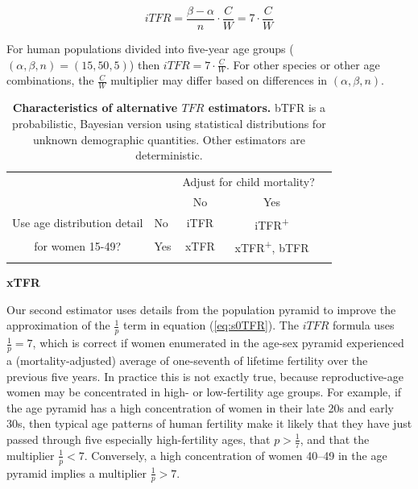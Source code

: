\documentclass[12pt]{article}
\begin{document}
\begin{equation}
\label{eq:iTFR}
iTFR  =  \frac{\beta - \alpha}{n}\cdot \frac{C}{W}  
      =  7\cdot\frac{C}{W}\nonumber 
\end{equation}

\noindent For human populations divided into five-year age groups
(\((\alpha,\beta,n)=(15,50,5)\)) then \(iTFR=7\cdot\tfrac{C}{W}\). For
other species or other age combinations, the \(\tfrac{C}{W}\) multiplier
may differ based on differences in \((\alpha,\beta,n)\).

\begin{table}[]
\centering
\caption{\textbf{Characteristics of alternative $TFR$ estimators.} bTFR is a probabilistic, Bayesian version using statistical distributions for unknown demographic quantities. Other estimators are deterministic.}
\label{methoddeployment}
\begin{tabular}{llccl}
                                                &                          & \multicolumn{2}{c}{Adjust for child mortality?}                                                                                        &  \\
                                                &                          & No                                                         & Yes                                                                       &  \\ \cline{3-4}
\multicolumn{1}{c}{Use age distribution detail} & \multicolumn{1}{l|}{No}  & \multicolumn{1}{c|}{iTFR} & \multicolumn{1}{c|}{iTFR\textsuperscript{+}}               &  \\ \cline{3-4}
\multicolumn{1}{c}{for women 15-49?}            & \multicolumn{1}{l|}{Yes} & \multicolumn{1}{c|}{xTFR} & \multicolumn{1}{c|}{xTFR\textsuperscript{+},   bTFR} &  \\ \cline{3-4}
                                                &                          & \multicolumn{1}{l}{}                                       & \multicolumn{1}{l}{}  
                        & \\                                      \cline{1-5}                        
\end{tabular}
\end{table}

\textbf{xTFR}

Our second estimator uses details from the population pyramid to improve
the approximation of the \(\frac{1}{p}\) term in equation
(\ref{eq:s0TFR}). The \(iTFR\) formula uses \(\tfrac{1}{p}=7\), which is
correct if women enumerated in the age-sex pyramid experienced a
(mortality-adjusted) average of one-seventh of lifetime fertility over
the previous five years. In practice this is not exactly true, because
reproductive-age women may be concentrated in high- or low-fertility age
groups. For example, if the age pyramid has a high concentration of
women in their late 20s and early 30s, then typical age patterns of
human fertility make it likely that they have just passed through five
especially high-fertility ages, that \(p>\tfrac{1}{7}\), and that the
multiplier \(\tfrac{1}{p}<7\). Conversely, a high concentration of women
40--49 in the age pyramid implies a multiplier \(\tfrac{1}{p}>7\).
\end{document}
